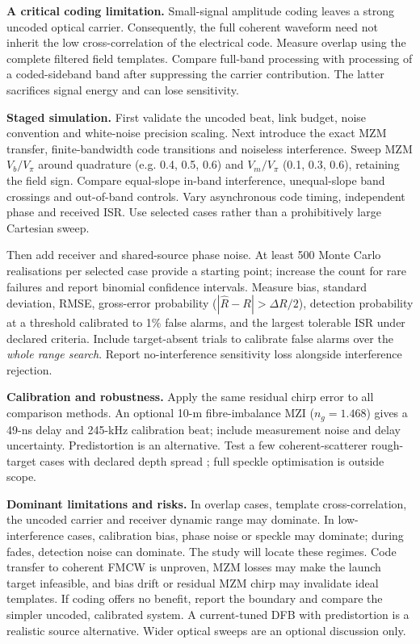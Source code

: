 \documentclass[10pt,letterpaper]{article}
\begin{document}
\textbf{A critical coding limitation.} Small-signal amplitude coding leaves a strong uncoded optical carrier. Consequently, the full coherent waveform need not inherit the low cross-correlation of the electrical code. Measure overlap using the complete filtered field templates. Compare full-band processing with processing of a coded-sideband band after suppressing the carrier contribution. The latter sacrifices signal energy and can lose sensitivity.

\textbf{Staged simulation.} First validate the uncoded beat, link budget, noise convention and white-noise precision scaling. Next introduce the exact MZM transfer, finite-bandwidth code transitions and noiseless interference. Sweep MZM $V_b/V_\pi$ around quadrature (e.g. 0.4, 0.5, 0.6) and $V_m/V_\pi$ (0.1, 0.3, 0.6), retaining the field sign. Compare equal-slope in-band interference, unequal-slope band crossings and out-of-band controls. Vary asynchronous code timing, independent phase and received ISR. Use selected cases rather than a prohibitively large Cartesian sweep.

Then add receiver and shared-source phase noise. At least 500 Monte Carlo realisations per selected case provide a starting point; increase the count for rare failures and report binomial confidence intervals. Measure bias, standard deviation, RMSE, gross-error probability ($|\widehat R-R|>\Delta R/2$), detection probability at a threshold calibrated to 1\% false alarms, and the largest tolerable ISR under declared criteria. Include target-absent trials to calibrate false alarms over the \emph{whole range search}. Report no-interference sensitivity loss alongside interference rejection.

\textbf{Calibration and robustness.} Apply the same residual chirp error to all comparison methods. An optional 10-m fibre-imbalance MZI ($n_g=1.468$) gives a 49-ns delay and 245-kHz calibration beat; include measurement noise and delay uncertainty. Predistortion \cite{zhang} is an alternative. Test a few coherent-scatterer rough-target cases with declared depth spread \cite{baumann}; full speckle optimisation is outside scope.

\textbf{Dominant limitations and risks.} In overlap cases, template cross-correlation, the uncoded carrier and receiver dynamic range may dominate. In low-interference cases, calibration bias, phase noise or speckle may dominate; during fades, detection noise can dominate. The study will locate these regimes. Code transfer to coherent FMCW is unproven, MZM losses may make the launch target infeasible, and bias drift or residual MZM chirp may invalidate ideal templates. If coding offers no benefit, report the boundary and compare the simpler uncoded, calibrated system. A current-tuned DFB with predistortion \cite{zhang} is a realistic source alternative. Wider optical sweeps are an optional discussion only.
\end{document}
